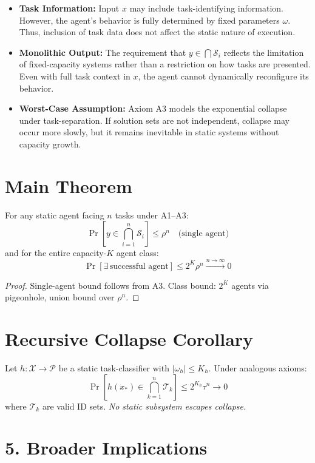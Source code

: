 \documentclass{article}
\newcommand{\Pcal}{\mathscr{P}}
\newcommand{\Scal}{\mathscr{S}}
\newcommand{\Tcal}{\mathscr{T}}
\begin{document}
\begin{itemize}
  \item \textbf{Task Information:} Input $x$ may include task-identifying information. However, the agent’s behavior is fully determined by fixed parameters $\omega$. Thus, inclusion of task data does not affect the static nature of execution.

  \item \textbf{Monolithic Output:} The requirement that $y \in \bigcap \mathcal{S}_i$ reflects the limitation of fixed-capacity systems rather than a restriction on how tasks are presented. Even with full task context in $x$, the agent cannot dynamically reconfigure its behavior.

  \item \textbf{Worst-Case Assumption:} Axiom A3 models the exponential collapse under task-separation. If solution sets are not independent, collapse may occur more slowly, but it remains inevitable in static systems without capacity growth.
\end{itemize}
\section{Main Theorem}
\begin{theorem}
For any static agent facing $n$ tasks under A1--A3:
\[
\Pr\left[y \in \bigcap_{i=1}^{n}\Scal_i\right] \leq \rho^{n} \quad \text{(single agent)} 
\]
and for the entire capacity-$K$ agent class:
\[
\Pr\left[\exists\,\text{successful agent}\right] \leq 2^{K}\rho^{n} \xrightarrow{n \to \infty} 0
\]
\end{theorem}
\begin{proof}
Single-agent bound follows from A3. Class bound: $2^K$ agents via pigeonhole, union bound over $\rho^n$.
\end{proof}

\section{Recursive Collapse Corollary}
\begin{corollary}
Let $h: \mathcal{X} \to \Pcal$ be a static task-classifier with $|\omega_h| \leq K_h$. Under analogous axioms:
\[
\Pr\left[h(x_*) \in \bigcap_{k=1}^{n}\Tcal_k\right] \leq 2^{K_h}\tau^{n} \to 0
\]
where $\Tcal_k$ are valid ID sets. \textit{No static subsystem escapes collapse.}
\end{corollary}
\section*{5. Broader Implications}
\end{document}
